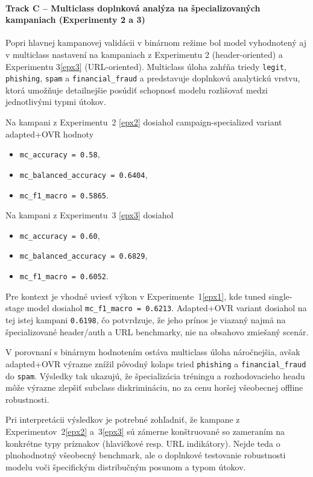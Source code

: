 \documentclass[conference]{IEEEtran}
\begin{document}
\paragraph{Track C – Multiclass doplnková analýza na špecializovaných kampaniach (Experimenty 2 a 3)}

Popri hlavnej kampanovej validácii v binárnom režime bol model
vyhodnotený aj v multiclass nastavení na kampaniach z Experimentu 2
(header-oriented) a Experimentu 3\ref{epx3} (URL-oriented).
Multiclass úloha zahŕňa triedy \texttt{legit}, \texttt{phishing},
\texttt{spam} a \texttt{financial\_fraud} a predstavuje doplnkovú
analytickú vrstvu, ktorá umožňuje detailnejšie posúdiť schopnosť
modelu rozlišovať medzi jednotlivými typmi útokov.

Na kampani z Experimentu~2 \ref{epx2} dosiahol campaign-specialized
variant adapted+OVR hodnoty
\begin{itemize}
    \item \texttt{mc\_accuracy = 0.58},
    \item \texttt{mc\_balanced\_accuracy = 0.6404},
    \item \texttt{mc\_f1\_macro = 0.5865}.
\end{itemize}

Na kampani z Experimentu~3 \ref{epx3} dosiahol
\begin{itemize}
    \item \texttt{mc\_accuracy = 0.60},
    \item \texttt{mc\_balanced\_accuracy = 0.6829},
    \item \texttt{mc\_f1\_macro = 0.6052}.
\end{itemize}


Pre kontext je vhodné uviesť výkon v Experimente~1\ref{epx1},
kde tuned single-stage model dosiahol \texttt{mc\_f1\_macro = 0.6213}.
Adapted+OVR variant dosiahol na tej istej kampani \texttt{0.6198},
čo potvrdzuje, že jeho prínos je viazaný najmä na špecializované
header/auth a URL benchmarky, nie na obsahovo zmiešaný scenár.

V porovnaní s binárnym hodnotením ostáva multiclass úloha náročnejšia,
avšak adapted+OVR výrazne znížil pôvodný kolaps tried
\texttt{phishing} a \texttt{financial\_fraud} do \texttt{spam}.
Výsledky tak ukazujú, že špecializácia tréningu a rozhodovacieho
headu môže výrazne zlepšiť subclass diskrimináciu, no za cenu
horšej všeobecnej offline robustnosti.

Pri interpretácii výsledkov je potrebné zohľadniť, že kampane z
Experimentov~2\ref{epx2} a~3\ref{epx3} sú zámerne konštruované so zameraním na konkrétne
typy príznakov (hlavičkové resp. URL indikátory). Nejde teda o
plnohodnotný všeobecný benchmark, ale o doplnkové testovanie
robustnosti modelu voči špecifickým distribučným posunom a typom útokov.
\end{document}
